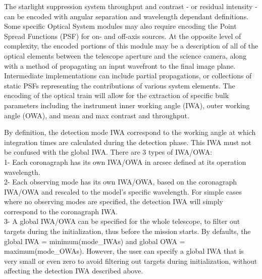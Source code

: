 \documentclass[cleanfoot]{asme2ej}
\begin{document}
The starlight suppression system throughput and contrast - or residual intensity - can be encoded with angular separation and wavelength dependant definitions. Some specific Optical System modules may also require encoding the Point Spread Functions (PSF) for on- and off-axis sources. At the opposite level of complexity, the encoded portions of this module may be a description of all of the optical elements between the telescope aperture and the science camera, along with a method of propagating an input wavefront to the final image plane.  Intermediate implementations can include partial propagations, or collections of static PSFs representing the contributions of various system elements.  The encoding of the optical train will allow for the extraction of specific bulk parameters including the instrument inner working angle (IWA), outer working angle (OWA), and mean and max contrast and throughput.

By definition, the detection mode IWA correspond to the working angle at which integration times are calculated during the detection phase. This IWA must not be confused with the global IWA. There are 3 types of IWA/OWA:\\
1- Each coronagraph has its own IWA/OWA in arcsec defined at its operation wavelength.\\
2- Each observing mode has its own IWA/OWA, based on the coronagraph IWA/OWA and rescaled to the model's specific wavelength. For simple cases where no observing modes are specified, the detection IWA will simply correspond to the coronagraph IWA.\\
3- A global IWA/OWA can be specified for the whole telescope, to filter out targets during the initialization, thus before the mission starts. By defaults, the global IWA = minimum(mode\_IWAs) and global OWA = maximum(mode\_OWAs). However, the user can specify a global IWA that is very small or even zero to avoid filtering out targets during initialization, without affecting the detection IWA described above.
\end{document}
